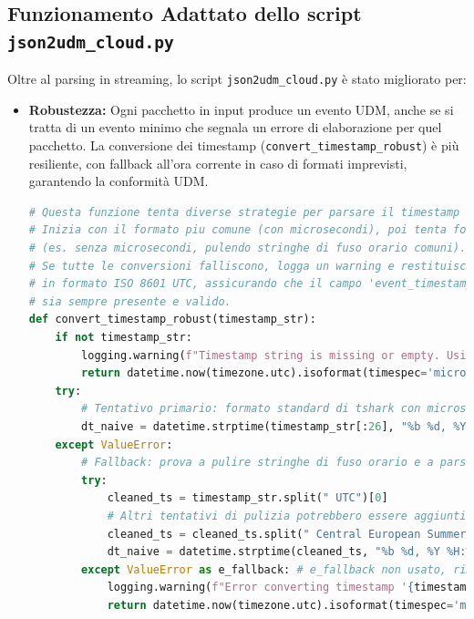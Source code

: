 \documentclass[11pt, a4paper]{article}
\begin{document}
\subsection{Funzionamento Adattato dello script \texttt{json2udm\_cloud.py}}
Oltre al parsing in streaming, lo script \texttt{json2udm\_cloud.py} è stato migliorato per:
\begin{itemize}
    \item \textbf{Robustezza:} Ogni pacchetto in input produce un evento UDM, anche se si tratta di un evento minimo che segnala un errore di elaborazione per quel pacchetto. La conversione dei timestamp (\texttt{convert\_timestamp\_robust}) è più resiliente, con fallback all'ora corrente in caso di formati imprevisti, garantendo la conformità UDM.

    \begin{lstlisting}[language=Python, caption={Estratto da \texttt{json2udm\_cloud.py}: Funzione \texttt{convert\_timestamp\_robust}.}, label=lst:convert_timestamp, basicstyle=\ttfamily\scriptsize]
# Questa funzione tenta diverse strategie per parsare il timestamp fornito da tshark.
# Inizia con il formato piu comune (con microsecondi), poi tenta formati alternativi
# (es. senza microsecondi, pulendo stringhe di fuso orario comuni).
# Se tutte le conversioni falliscono, logga un warning e restituisce l'ora corrente
# in formato ISO 8601 UTC, assicurando che il campo 'event_timestamp' dell'UDM
# sia sempre presente e valido.
def convert_timestamp_robust(timestamp_str):
    if not timestamp_str:
        logging.warning(f"Timestamp string is missing or empty. Using current time as fallback.")
        return datetime.now(timezone.utc).isoformat(timespec='microseconds').replace('+00:00', 'Z')
    try:
        # Tentativo primario: formato standard di tshark con microsecondi
        dt_naive = datetime.strptime(timestamp_str[:26], "%b %d, %Y %H:%M:%S.%f")
    except ValueError:
        # Fallback: prova a pulire stringhe di fuso orario e a parsare senza microsecondi
        try:
            cleaned_ts = timestamp_str.split(" UTC")[0]
            # Altri tentativi di pulizia potrebbero essere aggiunti qui
            cleaned_ts = cleaned_ts.split(" Central European Summer Time")[0].strip()
            dt_naive = datetime.strptime(cleaned_ts, "%b %d, %Y %H:%M:%S")
        except ValueError as e_fallback: # e_fallback non usato, rimosso per pulizia warning
            logging.warning(f"Error converting timestamp '{timestamp_str}' ... Using current time.")
            return datetime.now(timezone.utc).isoformat(timespec='microseconds').replace('+00:00', 'Z')


\end{lstlisting}
\end{itemize}
\end{document}
